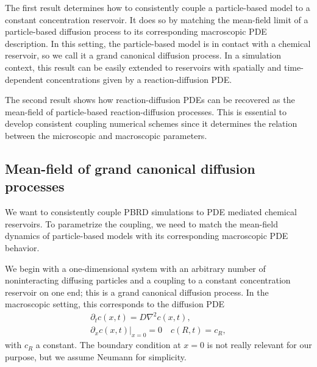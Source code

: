 \documentclass[10pt,twocolumn]{revtex4-1}
\begin{document}
	The first result determines how to consistently couple a particle-based model to a constant concentration reservoir. It does so by matching the mean-field limit of a particle-based diffusion process to its corresponding macroscopic PDE description. In this setting, the particle-based model is in contact with a chemical reservoir, so we call it a grand canonical diffusion process. In a simulation context, this result can be easily extended to reservoirs with spatially and time-dependent concentrations given by a reaction-diffusion PDE. 
	
	The second result shows how reaction-diffusion PDEs can be recovered as the mean-field of particle-based reaction-diffusion processes. This is essential to develop consistent coupling numerical schemes since it determines the relation between the microscopic and macroscopic parameters.
	
	
	\subsection{Mean-field of grand canonical diffusion processes} \label{sec:opendiffMF} %
	We want to consistently couple PBRD simulations to PDE mediated chemical reservoirs. To parametrize the coupling, we need to match the mean-field dynamics of particle-based models with its corresponding macroscopic PDE behavior.
	
	We begin with a one-dimensional system with an arbitrary number of noninteracting diffusing particles and a coupling to a constant concentration reservoir on one end; this is a grand canonical diffusion process. In the macroscopic setting, this corresponds to the diffusion PDE
	\begin{align}
	\partial_{t} c(x,t)= D\nabla^2 c(x,t), \label{eq:diff0}\\ 
	\partial_x c(x, t) |_{x=0} = 0  \quad c(R,t)=c_R,
	\nonumber
	\end{align}
	with $c_R$ a constant. The boundary condition at $x=0$ is not really relevant for our purpose, but we assume Neumann for simplicity.
	
\end{document}
